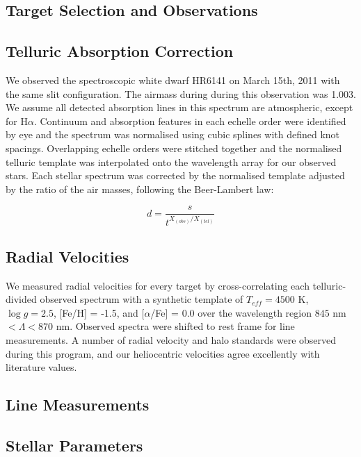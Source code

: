 \documentclass{emulateapj}
\begin{document}

\subsection{Target Selection and Observations}

\subsection{Telluric Absorption Correction}

We observed the spectroscopic white dwarf HR6141 on March 15th, 2011 with the same slit configuration. The airmass during during this observation was 1.003. We assume all detected absorption lines in this spectrum are atmospheric, except for H$\alpha$. Continuum and absorption features in each echelle order were identified by eye and the spectrum was normalised using cubic splines with defined knot spacings. Overlapping echelle orders were stitched together and the normalised telluric template was interpolated onto the wavelength array for our observed stars. Each stellar spectrum was corrected by the normalised template adjusted by the ratio of the air masses, following the Beer-Lambert law:

\begin{equation}
d = \frac{s}{t^{X_{(obs)}/X_{(tel)}}}
\end{equation}

\subsection{Radial Velocities}
We measured radial velocities for every target by cross-correlating each telluric-divided observed spectrum with a synthetic template of $T_{eff} = 4500$ K, $\log{g} = 2.5$, [Fe/H] = -1.5, and [$\alpha$/Fe] = 0.0 over the wavelength region $845$ nm $< \Lambda < 870$ nm. Observed spectra were shifted to rest frame for line measurements. A number of radial velocity and halo standards were observed during this program, and our heliocentric velocities agree excellently with literature values.

\subsection{Line Measurements}

\subsection{Stellar Parameters}
\end{document}
